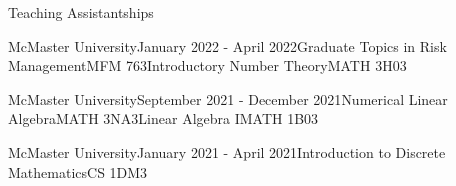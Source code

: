 \begin{rSection}{Teaching Assistantships}

\begin{taSubsectionFull}{McMaster University}{January 2022 - April 2022}{Graduate Topics in Risk Management}{MFM 763}{Introductory Number Theory}{MATH 3H03}
\end{taSubsectionFull}

\begin{taSubsectionFull}{McMaster University}{September 2021 - December 2021}{Numerical Linear Algebra}{MATH 3NA3}{Linear Algebra I}{MATH 1B03}
\end{taSubsectionFull}

\begin{taSubsectionMin}{McMaster University}{January 2021 - April 2021}{Introduction to Discrete Mathematics}{CS 1DM3}
\end{taSubsectionMin}

\end{rSection}